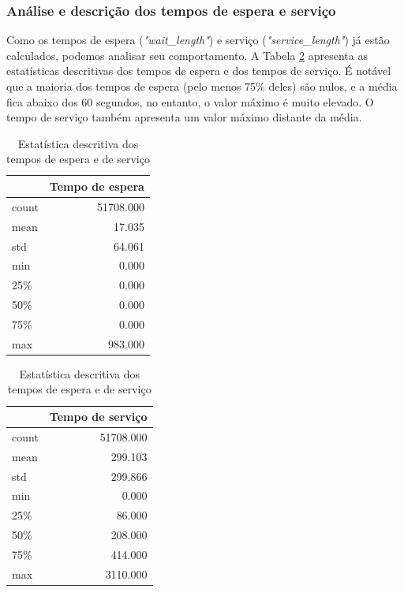 \subsubsection{Análise e descrição dos tempos de espera e serviço}
Como os tempos de espera (\textit{"wait\_length"}) e serviço (\textit{"service\_length"}) já estão calculados, podemos analisar seu comportamento. A Tabela \ref*{tab: descricao-serviço-espera} apresenta as estatísticas descritivas dos tempos de espera e dos tempos de serviço. É notável que a maioria dos tempos de espera (pelo menos 75\% deles) são nulos, e a média fica abaixo dos 60 segundos, no entanto, o valor máximo é muito elevado. O tempo de serviço também apresenta um valor máximo distante da média.

\begin{table}[H]
\centering
    \begin{tabular}{lr}
            \toprule
            {} &  Tempo de espera \\
            \midrule
            count &   51708.000  \\
            mean  &      17.035  \\
            std   &      64.061  \\
            min   &       0.000  \\
            25\%   &       0.000  \\
            50\%   &       0.000  \\
            75\%   &       0.000  \\
            max   &     983.000  \\
        \bottomrule
    \end{tabular}
    \quad
    \begin{tabular}{lr}
            \toprule
            {} &  Tempo de serviço \\
            \midrule
            count &     51708.000   \\
            mean  &       299.103   \\
            std   &       299.866   \\
            min   &         0.000   \\
            25\%   &        86.000   \\
            50\%   &       208.000   \\
            75\%   &       414.000   \\
            max   &      3110.000   \\
        \bottomrule
    \end{tabular}
    \caption{Estatística descritiva dos tempos de espera e de serviço}
    \label{tab: descricao-serviço-espera}
\end{table}

